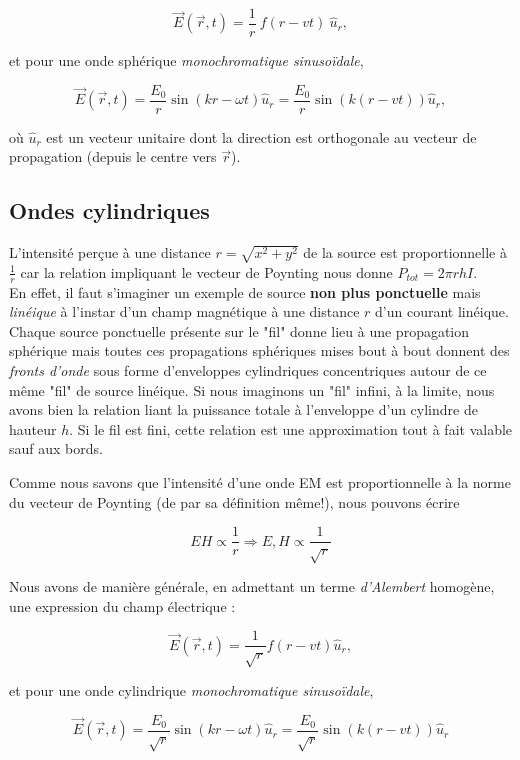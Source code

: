 \[\vec{E}(\vec{r},t) = \frac{1}{r} \:f(r-vt) \:\hat{u}_{r},\] 

et pour une onde sphérique \textit{monochromatique sinusoïdale},

\[\vec{E}(\vec{r},t) = \frac{E_{0}}{r} \sin(kr-\omega t) \hat{u}_{r} = \frac{E_{0}}{r} \sin(k(r- vt)) \hat{u}_{r}, \]

où $\hat{u}_{r}$ est un vecteur unitaire dont la direction est orthogonale au vecteur de propagation (depuis le centre vers $\vec{r}$).


\subsection{Ondes cylindriques} 

L'intensité perçue à une distance $r = \sqrt{x^{2} + y^{2}}$ de la source est proportionnelle à $\frac{1}{r}$ car la relation impliquant le vecteur de Poynting nous 
donne $P_{tot} = 2 \pi r h I$. \\ En effet, il faut s'imaginer un exemple de source \textbf{non plus ponctuelle} mais \textit{linéique} à l'instar d'un champ magnétique à une 
distance $r$ d'un courant linéique. Chaque source ponctuelle présente sur le "fil" donne lieu à une propagation sphérique mais toutes ces propagations sphériques mises bout à bout donnent 
des \textit{fronts d'onde} sous forme d'enveloppes cylindriques concentriques autour de ce même "fil" de source linéique. Si nous imaginons un "fil" infini, à la limite,
nous avons bien la relation liant la puissance totale à l'enveloppe d'un cylindre de hauteur $h$. Si le fil est fini, cette relation est une approximation tout à fait valable sauf 
aux bords.

Comme nous savons que l'intensité d'une onde EM est proportionnelle à la norme du vecteur de Poynting (de par sa définition même!), nous pouvons écrire 

\[ EH \propto \frac{1}{r} \Rightarrow E,H \propto \frac{1}{\sqrt{r}}\]

Nous avons de manière générale, en admettant un terme \textit{d'Alembert} homogène, une expression du champ électrique : 

\[\vec{E}(\vec{r},t) = \frac{1}{\sqrt{r}} f(r-vt) \hat{u}_{r},\] 

et pour une onde cylindrique \textit{monochromatique sinusoïdale},

\[\vec{E}(\vec{r},t) = \frac{E_{0}}{\sqrt{r}} \sin(kr - \omega t) \hat{u}_{r} = \frac{E_{0}}{\sqrt{r}} \sin(k(r - v t)) \hat{u}_{r}\]

